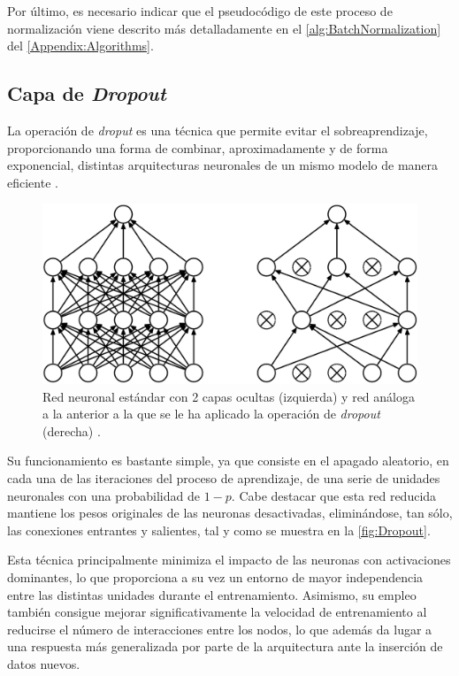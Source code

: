Por último, es necesario indicar que el pseudocódigo de este proceso de normalización viene descrito más detalladamente en el \autoref{alg:BatchNormalization} del \autoref{Appendix:Algorithms}.

\subsection{Capa de \textit{Dropout}}

La operación de \textit{droput} es una técnica que permite evitar el sobreaprendizaje, proporcionando una forma de combinar, aproximadamente y de forma exponencial, distintas arquitecturas neuronales de un mismo modelo de manera eficiente \cite{Srivastava}. 

\begin{figure}
    \centering
    \includegraphics[scale=0.25]{Images/Dropout.png}
    \caption{Red neuronal estándar con 2 capas ocultas (izquierda) y red análoga a la anterior a la que se le ha aplicado la operación de \textit{dropout} (derecha) \cite{Srivastava}.}
    \label{fig:Dropout}
\end{figure}

Su funcionamiento es bastante simple, ya que consiste en el apagado aleatorio, en cada una de las iteraciones del proceso de aprendizaje, de una serie de unidades neuronales con una probabilidad de $1 - p$. Cabe destacar que esta red reducida mantiene los pesos originales de las neuronas desactivadas, eliminándose, tan sólo, las conexiones entrantes y salientes, tal y como se muestra en la \autoref{fig:Dropout}.

Esta técnica principalmente minimiza el impacto de las neuronas con activaciones dominantes, lo que proporciona a su vez un entorno de mayor independencia entre las distintas unidades durante el entrenamiento. Asimismo, su empleo también consigue mejorar significativamente la velocidad de entrenamiento al reducirse el número de interacciones entre los nodos, lo que además da lugar a una respuesta más generalizada por parte de la arquitectura ante la inserción de datos nuevos.

